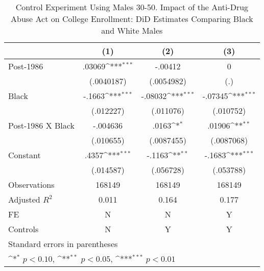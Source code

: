 \begin{table}[htbp]\centering
\def\sym#1{\ifmmode^{#1}\else\(^{#1}\)\fi}
\caption{Control Experiment Using Males 30-50. Impact of the Anti-Drug Abuse Act on College Enrollment: DiD Estimates Comparing Black and White Males}
\begin{tabular}{l*{3}{c}}
\hline\hline
                    &\multicolumn{1}{c}{(1)}         &\multicolumn{1}{c}{(2)}         &\multicolumn{1}{c}{(3)}         \\
\hline
Post-1986           &      .03069\sym{***}&     -.00412         &           0         \\
                    &  (.0040187)         &  (.0054982)         &         (.)         \\
[1em]
Black               &      -.1663\sym{***}&     -.08032\sym{***}&     -.07345\sym{***}\\
                    &   (.012227)         &   (.011076)         &   (.010752)         \\
[1em]
Post-1986 X Black   &    -.004636         &       .0163\sym{*}  &      .01906\sym{**} \\
                    &   (.010655)         &  (.0087455)         &  (.0087068)         \\
[1em]
Constant            &       .4357\sym{***}&      -.1163\sym{**} &      -.1683\sym{***}\\
                    &   (.014587)         &   (.056728)         &   (.053788)         \\
\hline
Observations        &      168149         &      168149         &      168149         \\
Adjusted \(R^{2}\)  &       0.011         &       0.164         &       0.177         \\
FE                  &           N         &           N         &           Y         \\
Controls            &           N         &           Y         &           Y         \\
\hline\hline
\multicolumn{4}{l}{\footnotesize Standard errors in parentheses}\\
\multicolumn{4}{l}{\footnotesize \sym{*} \(p<0.10\), \sym{**} \(p<0.05\), \sym{***} \(p<0.01\)}\\
\end{tabular}
\end{table}

